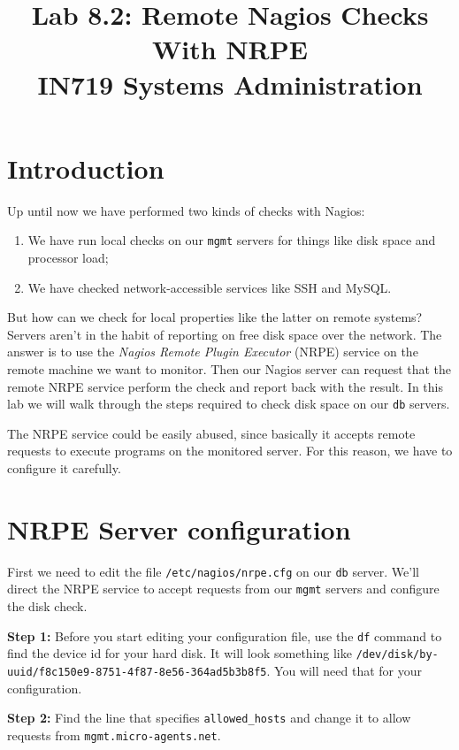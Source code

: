 \documentclass{article}   	%
\title{Lab 8.2:  Remote Nagios Checks With NRPE\\ IN719 Systems Administration}
\date{}							%
\begin{document}
\maketitle

\section*{Introduction}
Up until now we have performed two kinds of checks with Nagios:

\begin{enumerate}
  \item We have run local checks on our \texttt{mgmt} servers for things like disk space and processor load;
  \item We have checked network-accessible services like SSH and MySQL.
\end{enumerate}

But how can we check for local properties like the latter on remote systems?  Servers aren't in the habit of reporting on free disk space over the network.  The answer is to use the \emph{Nagios Remote Plugin Executor} (NRPE) service on the remote machine we want to monitor.  Then our Nagios server can request that the remote NRPE service perform the check and report back with the result.  In this lab we will walk through the steps required to check disk space on our \texttt{db} servers.

The NRPE service could be easily abused, since basically it accepts remote requests to execute programs on the monitored server.  For this reason, we have to configure it carefully.

\section{NRPE Server configuration}
First we need to edit the file \texttt{/etc/nagios/nrpe.cfg} on our \texttt{db} server.  We'll direct the NRPE service to accept requests from our \texttt{mgmt} servers and configure the disk check.

\textbf{Step 1:} Before you start editing your configuration file, use the \texttt{df} command to find the device id for your hard disk.  It will look something like \texttt{/dev/disk/by-uuid/f8c150e9-8751-4f87-8e56-364ad5b3b8f5}.  You will need that for your configuration.

\textbf{Step 2:} Find the line that specifies \texttt{allowed\_hosts} and change it to allow requests from \texttt{mgmt.micro-agents.net}.
\end{document}
